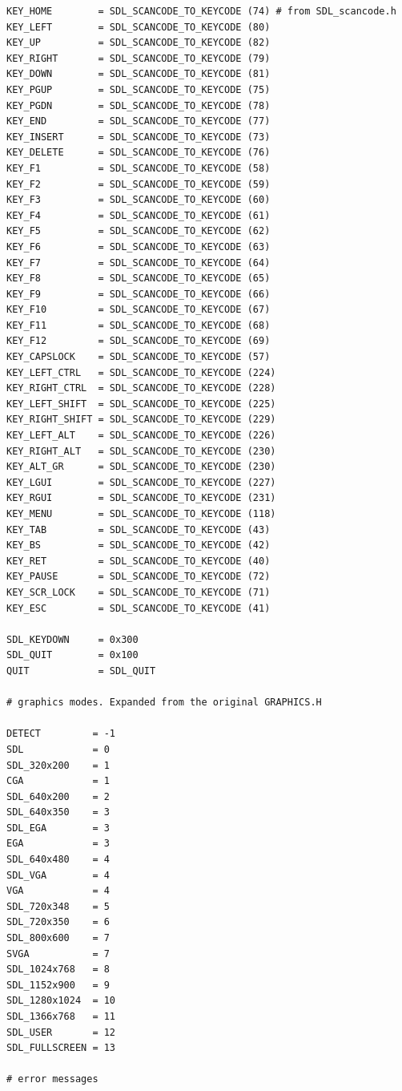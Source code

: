 \documentclass[a4paper,12pt]{article}
\begin{document}
\begin{footnotesize}
\begin{spacing}{0.8}
\begin{verbatim}
KEY_HOME        = SDL_SCANCODE_TO_KEYCODE (74) # from SDL_scancode.h
KEY_LEFT        = SDL_SCANCODE_TO_KEYCODE (80)
KEY_UP          = SDL_SCANCODE_TO_KEYCODE (82)
KEY_RIGHT       = SDL_SCANCODE_TO_KEYCODE (79)
KEY_DOWN        = SDL_SCANCODE_TO_KEYCODE (81)
KEY_PGUP        = SDL_SCANCODE_TO_KEYCODE (75)
KEY_PGDN        = SDL_SCANCODE_TO_KEYCODE (78)
KEY_END         = SDL_SCANCODE_TO_KEYCODE (77)
KEY_INSERT      = SDL_SCANCODE_TO_KEYCODE (73)
KEY_DELETE      = SDL_SCANCODE_TO_KEYCODE (76)
KEY_F1          = SDL_SCANCODE_TO_KEYCODE (58)
KEY_F2          = SDL_SCANCODE_TO_KEYCODE (59)
KEY_F3          = SDL_SCANCODE_TO_KEYCODE (60)
KEY_F4          = SDL_SCANCODE_TO_KEYCODE (61)
KEY_F5          = SDL_SCANCODE_TO_KEYCODE (62)
KEY_F6          = SDL_SCANCODE_TO_KEYCODE (63)
KEY_F7          = SDL_SCANCODE_TO_KEYCODE (64)
KEY_F8          = SDL_SCANCODE_TO_KEYCODE (65)
KEY_F9          = SDL_SCANCODE_TO_KEYCODE (66)
KEY_F10         = SDL_SCANCODE_TO_KEYCODE (67)
KEY_F11         = SDL_SCANCODE_TO_KEYCODE (68)
KEY_F12         = SDL_SCANCODE_TO_KEYCODE (69)
KEY_CAPSLOCK    = SDL_SCANCODE_TO_KEYCODE (57)
KEY_LEFT_CTRL   = SDL_SCANCODE_TO_KEYCODE (224)
KEY_RIGHT_CTRL  = SDL_SCANCODE_TO_KEYCODE (228)
KEY_LEFT_SHIFT  = SDL_SCANCODE_TO_KEYCODE (225)
KEY_RIGHT_SHIFT = SDL_SCANCODE_TO_KEYCODE (229)
KEY_LEFT_ALT    = SDL_SCANCODE_TO_KEYCODE (226)
KEY_RIGHT_ALT   = SDL_SCANCODE_TO_KEYCODE (230)
KEY_ALT_GR      = SDL_SCANCODE_TO_KEYCODE (230)
KEY_LGUI        = SDL_SCANCODE_TO_KEYCODE (227)
KEY_RGUI        = SDL_SCANCODE_TO_KEYCODE (231)
KEY_MENU        = SDL_SCANCODE_TO_KEYCODE (118)
KEY_TAB         = SDL_SCANCODE_TO_KEYCODE (43)
KEY_BS          = SDL_SCANCODE_TO_KEYCODE (42)
KEY_RET         = SDL_SCANCODE_TO_KEYCODE (40)
KEY_PAUSE       = SDL_SCANCODE_TO_KEYCODE (72)
KEY_SCR_LOCK    = SDL_SCANCODE_TO_KEYCODE (71)
KEY_ESC         = SDL_SCANCODE_TO_KEYCODE (41)

SDL_KEYDOWN     = 0x300
SDL_QUIT        = 0x100
QUIT            = SDL_QUIT

# graphics modes. Expanded from the original GRAPHICS.H

DETECT         = -1
SDL            = 0
SDL_320x200    = 1
CGA            = 1 
SDL_640x200    = 2
SDL_640x350    = 3
SDL_EGA        = 3
EGA            = 3
SDL_640x480    = 4
SDL_VGA        = 4
VGA            = 4
SDL_720x348    = 5
SDL_720x350    = 6
SDL_800x600    = 7
SVGA           = 7
SDL_1024x768   = 8
SDL_1152x900   = 9
SDL_1280x1024  = 10
SDL_1366x768   = 11
SDL_USER       = 12
SDL_FULLSCREEN = 13

# error messages


\end{verbatim}
\end{spacing}
\end{footnotesize}
\end{document}
